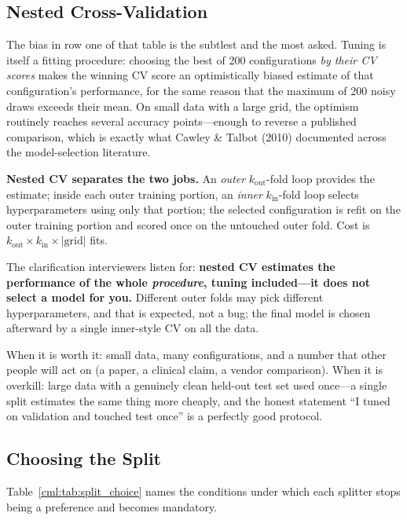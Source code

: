 \subsection{Nested Cross-Validation}

The bias in row one of that table is the subtlest and the most asked. Tuning is itself a fitting procedure: choosing the best of 200 configurations \emph{by their CV scores} makes the winning CV score an optimistically biased estimate of that configuration's performance, for the same reason that the maximum of 200 noisy draws exceeds their mean. On small data with a large grid, the optimism routinely reaches several accuracy points---enough to reverse a published comparison, which is exactly what Cawley \& Talbot (2010) documented across the model-selection literature.

\textbf{Nested CV separates the two jobs.} An \emph{outer} $k_{\text{out}}$-fold loop provides the estimate; inside each outer training portion, an \emph{inner} $k_{\text{in}}$-fold loop selects hyperparameters using only that portion; the selected configuration is refit on the outer training portion and scored once on the untouched outer fold. Cost is $k_{\text{out}} \times k_{\text{in}} \times |\text{grid}|$ fits.

The clarification interviewers listen for: \textbf{nested CV estimates the performance of the whole \emph{procedure}, tuning included---it does not select a model for you.} Different outer folds may pick different hyperparameters, and that is expected, not a bug; the final model is chosen afterward by a single inner-style CV on all the data.

When it is worth it: small data, many configurations, and a number that other people will act on (a paper, a clinical claim, a vendor comparison). When it is overkill: large data with a genuinely clean held-out test set used once---a single split estimates the same thing more cheaply, and the honest statement ``I tuned on validation and touched test once'' is a perfectly good protocol.

\subsection{Choosing the Split}

Table~\ref{cml:tab:split_choice} names the conditions under which each splitter stops being a preference and becomes mandatory.

